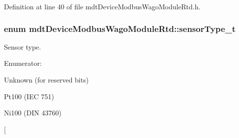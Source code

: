 Definition at line 40 of file mdtDeviceModbusWagoModuleRtd.h.

\hypertarget{classmdt_device_modbus_wago_module_rtd_a3ef847ef5be945559be1271e15905fb0}{
\subsubsection[{sensorType\_\-t}]{\setlength{\rightskip}{0pt plus 5cm}enum {\bf mdtDeviceModbusWagoModuleRtd::sensorType\_\-t}}}
\label{classmdt_device_modbus_wago_module_rtd_a3ef847ef5be945559be1271e15905fb0}


Sensor type. 

\begin{Desc}
\item[Enumerator: ]\par
\begin{description}
\item[{\em 
\hypertarget{classmdt_device_modbus_wago_module_rtd_a3ef847ef5be945559be1271e15905fb0ae8100af1e6f3854d65750dbcb9d57113}{
Unknown}
\label{classmdt_device_modbus_wago_module_rtd_a3ef847ef5be945559be1271e15905fb0ae8100af1e6f3854d65750dbcb9d57113}
}]Unknown (for reserved bits) \item[{\em 
\hypertarget{classmdt_device_modbus_wago_module_rtd_a3ef847ef5be945559be1271e15905fb0a92b751ccf35ea0f0675f8019ec6ff825}{
Pt100}
\label{classmdt_device_modbus_wago_module_rtd_a3ef847ef5be945559be1271e15905fb0a92b751ccf35ea0f0675f8019ec6ff825}
}]Pt100 (IEC 751) \item[{\em 
\hypertarget{classmdt_device_modbus_wago_module_rtd_a3ef847ef5be945559be1271e15905fb0ab444c547443f3cdfac1d44ce2dacea14}{
Ni100}
\label{classmdt_device_modbus_wago_module_rtd_a3ef847ef5be945559be1271e15905fb0ab444c547443f3cdfac1d44ce2dacea14}
}]Ni100 (DIN 43760) \item[{\em 
}
\end{description}
\end{Desc}

